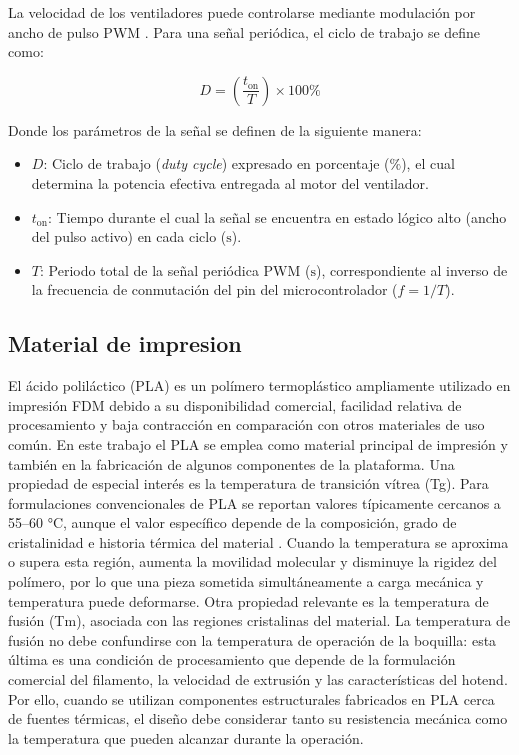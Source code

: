 La velocidad de los ventiladores puede controlarse mediante modulación por ancho de pulso PWM \cite{marlin_firmware}. Para una señal periódica, el ciclo de trabajo se define como:

\begin{equation}
    D = \left( \frac{t_{\text{on}}}{T} \right) \times 100\%
    \label{eq:ciclo_trabajo_pwm}
\end{equation}

Donde los parámetros de la señal se definen de la siguiente manera:

\begin{itemize}
    \item $D$: Ciclo de trabajo (\textit{duty cycle}) expresado en porcentaje ($\%$), el cual determina la potencia efectiva entregada al motor del ventilador.
    \item $t_{\text{on}}$: Tiempo durante el cual la señal se encuentra en estado lógico alto (ancho del pulso activo) en cada ciclo ($\text{s}$).
    \item $T$: Periodo total de la señal periódica PWM ($\text{s}$), correspondiente al inverso de la frecuencia de conmutación del pin del microcontrolador ($f = 1/T$).
\end{itemize}

\subsection{Material de impresion}
El ácido poliláctico (PLA) es un polímero termoplástico ampliamente utilizado en impresión FDM debido a su disponibilidad comercial, facilidad relativa de procesamiento y baja contracción en comparación con otros materiales de uso común. En este trabajo el PLA se emplea como material principal de impresión y también en la fabricación de algunos componentes de la plataforma.
Una propiedad de especial interés es la temperatura de transición vítrea (Tg). Para formulaciones convencionales de PLA se reportan valores típicamente cercanos a 55–60 °C, aunque el valor específico depende de la composición, grado de cristalinidad e historia térmica del material \cite{farah_2016}. Cuando la temperatura se aproxima o supera esta región, aumenta la movilidad molecular y disminuye la rigidez del polímero, por lo que una pieza sometida simultáneamente a carga mecánica y temperatura puede deformarse.
Otra propiedad relevante es la temperatura de fusión (Tm), asociada con las regiones cristalinas del material. La temperatura de fusión no debe confundirse con la temperatura de operación de la boquilla: esta última es una condición de procesamiento que depende de la formulación comercial del filamento, la velocidad de extrusión y las características del hotend. Por ello, cuando se utilizan componentes estructurales fabricados en PLA cerca de fuentes térmicas, el diseño debe considerar tanto su resistencia mecánica como la temperatura que pueden alcanzar durante la operación.

